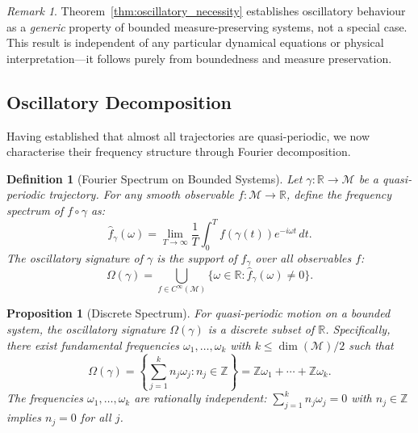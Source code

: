 \documentclass[twocolumn,10pt,a4paper]{article}
\newtheorem{proposition}[theorem]{Proposition}
\newtheorem{definition}[theorem]{Definition}
\theoremstyle{remark}
\newtheorem{remark}[theorem]{Remark}
\newcommand{\manifold}{\mathcal{M}}
\newcommand{\Reals}{\mathbb{R}}
\newcommand{\Integers}{\mathbb{Z}}
\begin{document}
\begin{remark}
Theorem~\ref{thm:oscillatory_necessity} establishes oscillatory behaviour as a \emph{generic} property of bounded measure-preserving systems, not a special case. This result is independent of any particular dynamical equations or physical interpretation—it follows purely from boundedness and measure preservation.
\end{remark}

\subsection{Oscillatory Decomposition}

Having established that almost all trajectories are quasi-periodic, we now characterise their frequency structure through Fourier decomposition.

\begin{definition}[Fourier Spectrum on Bounded Systems]
\label{def:fourier}
Let $\gamma: \Reals \to \manifold$ be a quasi-periodic trajectory. For any smooth observable $f: \manifold \to \Reals$, define the \emph{frequency spectrum} of $f \circ \gamma$ as:
\begin{equation}
\hat{f}_\gamma(\omega) = \lim_{T \to \infty} \frac{1}{T} \int_0^T f(\gamma(t)) e^{-i\omega t} \, dt.
\end{equation}
The \emph{oscillatory signature} of $\gamma$ is the support of $\hat{f}_\gamma$ over all observables $f$:
\begin{equation}
\Omega(\gamma) = \bigcup_{f \in C^\infty(\manifold)} \{\omega \in \Reals : \hat{f}_\gamma(\omega) \neq 0\}.
\end{equation}
\end{definition}

\begin{proposition}[Discrete Spectrum]
\label{prop:discrete_spectrum}
For quasi-periodic motion on a bounded system, the oscillatory signature $\Omega(\gamma)$ is a discrete subset of $\Reals$. Specifically, there exist fundamental frequencies $\omega_1, \ldots, \omega_k$ with $k \leq \dim(\manifold)/2$ such that
\begin{equation}
\Omega(\gamma) = \left\{\sum_{j=1}^k n_j \omega_j : n_j \in \Integers\right\} = \Integers \omega_1 + \cdots + \Integers \omega_k.
\end{equation}
The frequencies $\omega_1, \ldots, \omega_k$ are rationally independent: $\sum_{j=1}^k n_j \omega_j = 0$ with $n_j \in \Integers$ implies $n_j = 0$ for all $j$.
\end{proposition}
\end{document}
